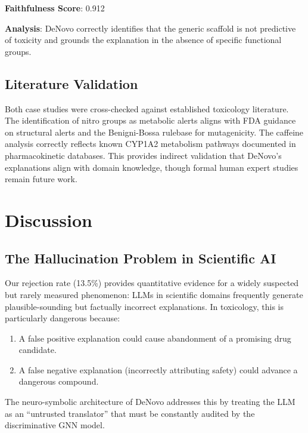 \documentclass[conference]{IEEEtran}
\newcommand{\RejRate}{13.5\%}            %
\begin{document}
\textbf{Faithfulness Score}: 0.912

\textbf{Analysis}: DeNovo correctly identifies that the generic scaffold is not predictive of toxicity and grounds the explanation in the absence of specific functional groups.

\subsection{Literature Validation}

Both case studies were cross-checked against established toxicology literature. The identification of nitro groups as metabolic alerts aligns with FDA guidance on structural alerts and the Benigni-Bossa rulebase for mutagenicity. The caffeine analysis correctly reflects known CYP1A2 metabolism pathways documented in pharmacokinetic databases. This provides indirect validation that DeNovo's explanations align with domain knowledge, though formal human expert studies remain future work.


\section{Discussion}

\subsection{The Hallucination Problem in Scientific AI}

Our rejection rate (\RejRate{}) provides quantitative evidence for a widely suspected but rarely measured phenomenon: LLMs in scientific domains frequently generate plausible-sounding but factually incorrect explanations. In toxicology, this is particularly dangerous because:

\begin{enumerate}
    \item A false positive explanation could cause abandonment of a promising drug candidate.
    \item A false negative explanation (incorrectly attributing safety) could advance a dangerous compound.
\end{enumerate}

The neuro-symbolic architecture of DeNovo addresses this by treating the LLM as an ``untrusted translator'' that must be constantly audited by the discriminative GNN model.
\end{document}
